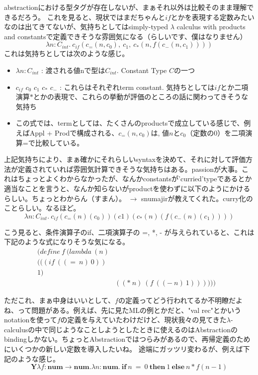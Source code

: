 \documentclass[9pt,fleqn]{jarticle}
\begin{document}
abstractionにおける型タグが存在しないが、まぁそれ以外は比較そのまま理解できるだろう。
これを見ると、現状ではまだちゃんと$if$とかを表現する定数みたいなのは出てきてないが、気持ちとしてはsimply-typed $\lambda$ calculus with products and constantsで定義できそうな雰囲気になる（らしいです、僕はなりません）
\begin{equation}\label{fact_lambda}
	\lambda n : C_{int}.\ c_{if}(c_{=}(n, c_0),\ c_1,\ c_*(n, f(c_{-}(n, c_1))))
\end{equation}
これは気持ちとしては次のような感じ。

\begin{itemize}
	\item $\lambda n:C_{int}$ : 渡される値nで型は$C_{int}$. Constant Type $C$の一つ
	\item $c_{if}$ $c_0$ $c_1$ $c_*$ $c_-$ : これらはそれぞれterm constant. 気持ちとしては$if$とか二項演算$*$とかの表現で、これらの挙動が評価のところの話に関わってきそうな気持ち
	\item この式では、termとしては、たくさんのproductsで成立している感じで、例えばAppl + Prodで構成される、$c_{=}(n, c_0)$は, 値$n$と$c_0$（定数の0）を二項演算=で比較している。
\end{itemize}

上記気持ちにより、まぁ確かにそれらしいsyntaxを決めて、それに対して評価方法が定義されていれば雰囲気計算できそうな気持ちはある。passionが大事。これはちょっとよくわからなかったが、なんかconstantsが'curried'typeであるとか適当なことを言うと、なんか知らないがproductを使わずに以下のようにかけるらしい。ちょっとわからん（すまん）。 $\rightarrow$ snumajirが教えてくれた。curry化のことらしい。なるほど。
\begin{equation*}
	\lambda n : C_{int}.\ c_{if}(c_{=}(n)(c_0))(c1)(c_{*}(n)(f(c_{-}(n)(c_{1}))))
\end{equation*}

こう見ると、条件演算子のif、二項演算子の =, *, - が与えられていると、これは下記のような式になりそうな気になる。
\begin{eqnarray*}
	(define\ f\ (lambda\ (n) & & \\
	(((if\ ((=\ n)\ 0)) & & \\
	1) & & \\
	& ((*\ n)\ (f\ ((-\ n)\ 1)))))) & 
\end{eqnarray*}

ただこれ、まぁ中身はいいとして、$f$の定義ってどう行われてるか不明瞭だよね、って問題がある。例えば、先に見たMLの例とかだと、"val rec"とかいうnotationを使って$f$の定義を与えていたわけだけど、現状我々の見てきた$\lambda$-calculusの中で同じようなことしようとしたときに使えるのはAbstractionのbindingしかない。ちょっとAbstractionではつらみがあるので、再帰定義のためにいくつかの新しい定数を導入したいね。
途端にガッツリ変わるが、例えば下記のような感じ。
\begin{equation}\label{y-conbinator}
	\bm{Y} \lambda f: \bm{num}\rightarrow\bm{num}. \lambda n:\bm{num}.\ \bm{if}\ n\ =\ 0\ \bm{then}\ 1\ \bm{else}\ n*f(n-1)
\end{equation}
\end{document}
